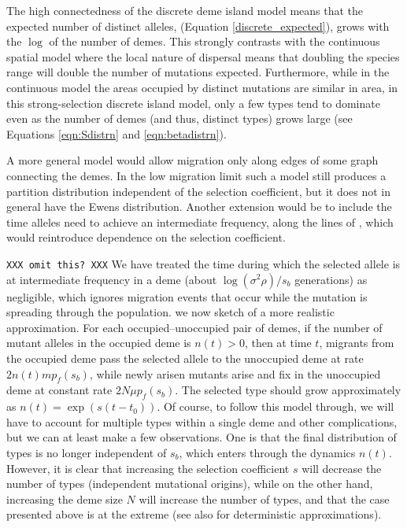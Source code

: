 \documentclass{article}
\begin{document}
The high connectedness of the discrete deme island model means that the expected number of distinct alleles, (Equation \eqref{discrete_expected}), 
grows with the $\log$ of the number of demes. This strongly contrasts with the continuous spatial model where the local nature of dispersal means that doubling the species range will double the number of mutations expected. 
Furthermore, while in the continuous model the areas occupied by distinct mutations are similar in area, in this strong-selection discrete island model, 
only a few types tend to dominate even as the number of demes (and thus, distinct types) grows large (see Equations \eqref{eqn:Sdistrn} and \eqref{eqn:betadistrn}).

A more general model would allow migration only along edges of some graph connecting the demes.
In the low migration limit such a model still produces a partition distribution independent of the selection coefficient,
but it does not in general have the Ewens distribution.
Another extension would be to include the time alleles need to achieve an intermediate frequency,
along the lines of \citet{Navarro:03}, which would reintroduce dependence on the selection coefficient.

\texttt{XXX omit this? XXX}
We have treated the time during which the selected allele is at intermediate frequency in a deme (about $\log(\sigma^2 \rho)/s_b$ generations) as negligible, 
which ignores migration events that occur while the mutation is spreading through the population. 
we now sketch of a more realistic approximation.
For each occupied--unoccupied pair of demes, if the number of mutant alleles in the occupied deme is $n(t)>0$,
then at time $t$, migrants from the occupied deme pass the selected allele to the unoccupied deme at rate $2 n(t) m p_f(s_b)$,
while newly arisen mutants arise and fix in the unoccupied deme at constant rate $2 N \mu p_f(s_b)$.
The selected type should grow approximately as $n(t)=\exp(s(t-t_0))$.
Of course, to follow this model through, we will have to account for multiple types within a single deme and other complications,
but we can at least make a few observations.
One is that the final distribution of types is no longer independent of $s_b$, which enters through the dynamics $n(t)$.
However, it is clear that increasing the selection coefficient $s$ will decrease the number of types (independent mutational origins),
while on the other hand, increasing the deme size $N$ will increase the number of types,
and that the case presented above is at the extreme (see also \cite{Navarro:03} for deterministic approximations). 
\end{document}

